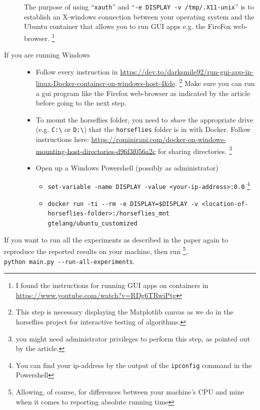\documentclass[11.5pt]{report}
\begin{document}
\begin{alphalist}
\begin{description}
The purpose of using  ``\verb|xauth|'' and ``\verb|-e DISPLAY -v /tmp/.X11-unix|'' is to establish an X-windows connection between your operating 
system and the Ubuntu container that allows you to run GUI apps e.g. the FireFox web-browser. 
\footnote{I found the instructions for running GUI apps on containers in \url{https://www.youtube.com/watch?v=RDg6TRwiPtg}}

\item[If you are running Windows]
  \begin{itemize}
    \item Follow every instruction in \url{https://dev.to/darksmile92/run-gui-app-in-linux-Docker-container-on-windows-host-4kde}.
    \footnote{This step is necessary displaying the Matplotlib canvas as we do in the horseflies project for interactive testing of algorithms.}
      Make sure you can run a gui program like the Firefox web-browser as indicated by the article before going to the next step. 

    \item To mount the horseflies folder, you need to \textit{share} the appropriate drive (e.g. \verb|C:\| or \verb|D:\|) that the \verb|horseflies| folder is in with Docker.
      Follow instructions here: \url{https://rominirani.com/docker-on-windows-mounting-host-directories-d96f3f056a2c}
      for sharing directories. \footnote{you might need administrator privileges to perform this step, as pointed out by the article.}

    \item Open up a Windows Powershell (possibly as administrator)
      \begin{itemize}
           \item \verb|set-variable -name DISPLAY -value <your-ip-address>:0.0| \footnote{You can find your ip-address by the output of the \texttt{ipconfig} command in the Powershell}
           \item \verb|docker run -ti --rm -e DISPLAY=$DISPLAY -v <location-of-horseflies-folder>:/horseflies_mnt  gtelang/ubuntu_customized|
      \end{itemize}
  \end{itemize}

\end{description}

\item {} If you want to run all the experiments as described in 
  the paper again to reproduce the reported results on your machine, then run \footnote{ Allowing, of course,
  for differences between your machine's CPU and mine when it comes to reporting absolute running time}, \\
  \verb|python main.py --run-all-experiments|. 


\end{alphalist}
\end{document}
